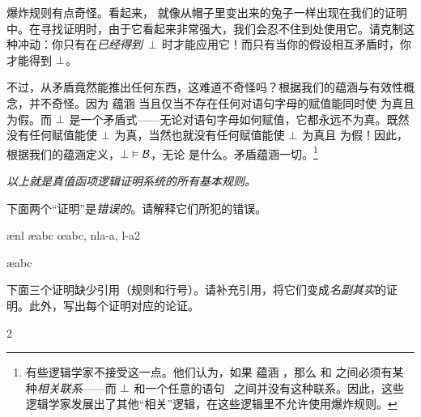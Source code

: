 爆炸规则有点奇怪。看起来， 就像从帽子里变出来的兔子一样出现在我们的证明中。在寻找证明时，由于它看起来非常强大，我们会忍不住到处使用它。请克制这种冲动：你只有在\emph{已经得到}~$\bot$ 时才能应用它！而只有当你的假设相互矛盾时，你才能得到 $\bot$。

不过，从矛盾竟然能推出任何东西，这难道不奇怪吗？根据我们的蕴涵与有效性概念，并不奇怪。因为  蕴涵 当且仅当不存在任何对语句字母的赋值能同时使  为真且  为假。而 $\bot$ 是一个矛盾式——无论对语句字母如何赋值，它都永远不为真。既然没有任何赋值能使 $\bot$ 为真，当然也就没有任何赋值能使 $\bot$ 为真且  为假！因此，根据我们的蕴涵定义，$\bot \vDash \mathcal{B}$，无论  是什么。矛盾蕴涵一切。\footnote{有些逻辑学家不接受这一点。他们认为，如果  蕴涵 ，那么  和  之间必须有某种\emph{相关联系}——而 $\bot$ 和一个任意的语句~ 之间并没有这种联系。因此，这些逻辑学家发展出了其他“相关”逻辑，在这些逻辑里不允许使用爆炸规则。}

\emph{以上就是真值函项逻辑证明系统的所有基本规则。}

\practiceproblems

\problempart
下面两个“证明”是\emph{错误的}。请解释它们所犯的错误。


\begin{fitchproof}
\PR
\open
{}\AS
{}\ae{nl}
	\ae{abc}
\close
\open
	\AS
\close
{}\oe{abc, nla-a, l-a2}
\end{fitchproof}

\begin{fitchproof}
\PR
{}\PR
{}\ae{abc}
\end{fitchproof}

\problempart
下面三个证明缺少引用（规则和行号）。请补充引用，将它们变成\emph{名副其实}的证明。此外，写出每个证明对应的论证。

\begin{multicols}{2}
\begin{fitchproof}
\end{fitchproof}

\begin{fitchproof}
\open
\close
{}%
\end{fitchproof}

\begin{fitchproof}
\open
\close
\open
\close
{}%
\end{fitchproof}
\end{multicols}

